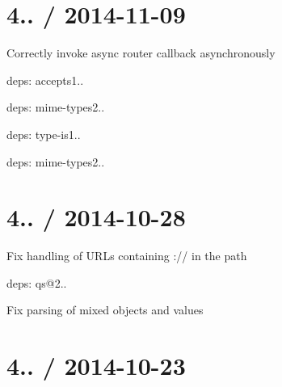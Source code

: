 {\ttfamily \section*{4.. / 2014-\/11-\/09 }}

{\ttfamily }

{\ttfamily 
\begin{DoxyItemize}
\item Correctly invoke async router callback asynchronously
\item deps\+: accepts1..
\begin{DoxyItemize}
\item deps\+: mime-\/types2..
\end{DoxyItemize}
\item deps\+: type-\/is1..
\begin{DoxyItemize}
\item deps\+: mime-\/types2..
\end{DoxyItemize}
\end{DoxyItemize}}

{\ttfamily \section*{4.. / 2014-\/10-\/28 }}

{\ttfamily }

{\ttfamily 
\begin{DoxyItemize}
\item Fix handling of U\+R\+Ls containing {\ttfamily \+://} in the path
\item deps\+: qs@2..
\begin{DoxyItemize}
\item Fix parsing of mixed objects and values
\end{DoxyItemize}
\end{DoxyItemize}}

{\ttfamily \section*{4.. / 2014-\/10-\/23 }}

{\ttfamily }

